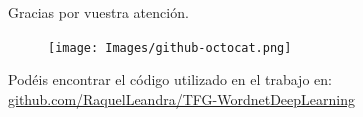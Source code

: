 \documentclass{beamer}
\begin{document}
\section*{}
\begin{frame}
    \centering
    \begin{huge}
    Gracias por vuestra atención.
    \end{huge}
        
        
    \begin{figure}
     \texttt{[image: Images/github-octocat.png]}
    \end{figure}
    Podéis encontrar el código utilizado en el trabajo en:
    \url{github.com/RaquelLeandra/TFG-WordnetDeepLearning}
   \end{frame}
\end{document}
